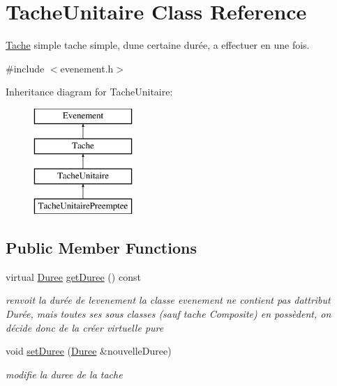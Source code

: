 \hypertarget{class_tache_unitaire}{}\section{Tache\+Unitaire Class Reference}
\label{class_tache_unitaire}


\hyperlink{class_tache}{Tache} simple tache simple, d\textquotesingle{}une certaine durée, a effectuer en une fois.  




{\ttfamily \#include $<$evenement.\+h$>$}

Inheritance diagram for Tache\+Unitaire\+:\begin{figure}[H]
\begin{center}
\leavevmode
\includegraphics[height=4.000000cm]{class_tache_unitaire}
\end{center}
\end{figure}
\subsection*{Public Member Functions}
\begin{DoxyCompactItemize}
\item 
\hypertarget{class_tache_unitaire_aeea74499e37ea186a85edb21503a9758}{}virtual \hyperlink{class_duree}{Duree} \hyperlink{class_tache_unitaire_aeea74499e37ea186a85edb21503a9758}{get\+Duree} () const \label{class_tache_unitaire_aeea74499e37ea186a85edb21503a9758}

\begin{DoxyCompactList}\small\item\em renvoit la durée de l\textquotesingle{}evenement la classe evenement ne contient pas d\textquotesingle{}attribut Durée, mais toutes ses sous classes (sauf tache Composite) en possèdent, on décide donc de la créer virtuelle pure \end{DoxyCompactList}\item 
void \hyperlink{class_tache_unitaire_a4472e37f36d315d2e02fe8d743bc6616}{set\+Duree} (\hyperlink{class_duree}{Duree} \&nouvelle\+Duree)
\begin{DoxyCompactList}\small\item\em modifie la duree de la tache \end{DoxyCompactList}\end{DoxyCompactItemize}
